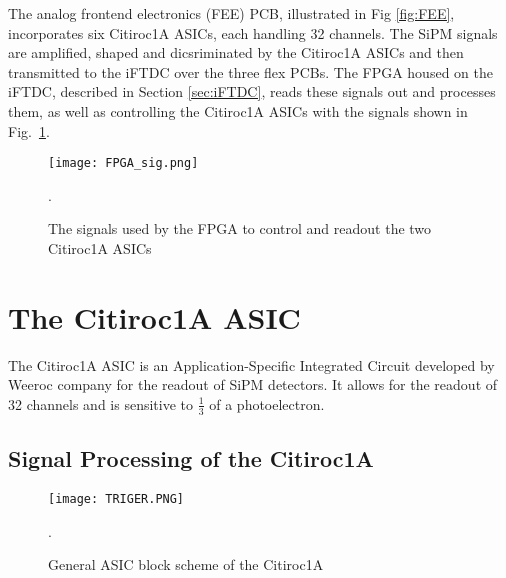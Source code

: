The analog frontend electronics (FEE) PCB, illustrated in Fig \ref{fig:FEE}, incorporates six Citiroc1A ASICs, each handling 32 channels.
The SiPM signals are amplified, shaped and dicsriminated by the Citiroc1A ASICs  and then transmitted to the iFTDC over the three flex PCBs.
\newline
The FPGA housed on the iFTDC, described in Section \ref{sec:iFTDC},
reads these signals out and processes them, as well as controlling the Citiroc1A ASICs with the signals shown in Fig.~\ref{fig:FPGA_sigs}\autocite{InternalcommunicationIgor}.
\begin{figure}[H]
    \centering
    \texttt{[image: FPGA\_sig.png]}
    \caption{The signals used by the FPGA to control and readout the two Citiroc1A ASICs\autocite{datasheetCITIROC}}.
    \label{fig:FPGA_sigs}
\end{figure}


\section{The Citiroc1A ASIC}
The Citiroc1A ASIC is an Application-Specific Integrated Circuit developed by Weeroc company for the readout of SiPM detectors.
It allows for the readout of 32 channels and is sensitive to $\frac{1}{3}$ of a photoelectron\autocite{datasheetCITIROC}.
\subsection{Signal Processing of the Citiroc1A}
\begin{figure}[h]
    \centering
    \texttt{[image: TRIGER.PNG]}
    \caption{General ASIC block scheme of the Citiroc1A\autocite{datasheetCITIROC}}.
    \label{fig:CITIROC1A_TRIGEER}
\end{figure}


